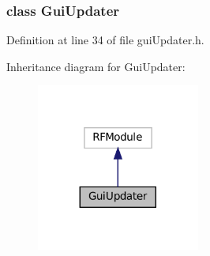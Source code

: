 \subsubsection{class Gui\+Updater}


Definition at line 34 of file gui\+Updater.\+h.



Inheritance diagram for Gui\+Updater\+:
\nopagebreak
\begin{figure}[H]
\begin{center}
\leavevmode
\includegraphics[width=152pt]{classGuiUpdater__inherit__graph}
\end{center}
\end{figure}
